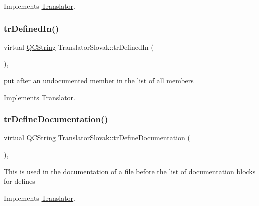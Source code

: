 Implements \mbox{\hyperlink{class_translator}{Translator}}.

\mbox{\label{class_translator_slovak_aaeb9dcf0748b7bfa05135a8618193586}} 
\subsubsection{\texorpdfstring{trDefinedIn()}{trDefinedIn()}}
{\footnotesize\ttfamily virtual \mbox{\hyperlink{class_q_c_string}{Q\+C\+String}} Translator\+Slovak\+::tr\+Defined\+In (\begin{DoxyParamCaption}{ }\end{DoxyParamCaption})\hspace{0.3cm}{\ttfamily [inline]}, {\ttfamily [virtual]}}

put after an undocumented member in the list of all members 

Implements \mbox{\hyperlink{class_translator}{Translator}}.

\mbox{\label{class_translator_slovak_aceae18914f0e069fc524b0d2f4a5ff04}} 
\subsubsection{\texorpdfstring{trDefineDocumentation()}{trDefineDocumentation()}}
{\footnotesize\ttfamily virtual \mbox{\hyperlink{class_q_c_string}{Q\+C\+String}} Translator\+Slovak\+::tr\+Define\+Documentation (\begin{DoxyParamCaption}{ }\end{DoxyParamCaption})\hspace{0.3cm}{\ttfamily [inline]}, {\ttfamily [virtual]}}

This is used in the documentation of a file before the list of documentation blocks for defines 

Implements \mbox{\hyperlink{class_translator}{Translator}}.

\mbox{\label{class_translator_slovak_a542498a9e2a3fb979eae3b6d0649cb84}} 
